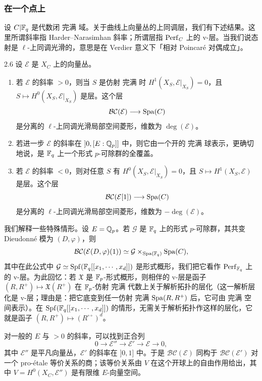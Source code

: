 \subsubsection{在一个点上}

设 $C|\mathbb{F}_q$ 是代数闭 完满 域。关于曲线上向量丛的上同调层，我们有下述结果。这里所谓斜率指 Harder–Narasimhan 斜率；所谓层指 $\operatorname{Perf}_C$ 上的 v-层。当我们说态射是 $\ell$-上同调光滑的，意思是在 Verdier 意义下「相对 Poincaré 对偶成立」。

\begin{thm}{2.6}
设 $\mathcal E$ 是 $X_C$ 上的向量丛。
\begin{enumerate}[label=(\arabic*),leftmargin=2.2em,itemsep=0.2em]
\item 若 $\mathcal E$ 的斜率 $>0$，则当 $S$ 是仿射 完满 时 $H^1(X_S,\mathcal E|_{X_S})=0$，且 $S\mapsto H^0(X_S,\mathcal E|_{X_S})$ 是层。这个层
\[
\mathcal{BC}(\mathcal E)\longrightarrow\operatorname{Spa}(C)
\]
是分离的 $\ell$-上同调光滑局部空间菱形，维数为 $\deg(\mathcal E)$。
\item 若进一步 $\mathcal E$ 的斜率在 $]0,[E:\mathbb{Q}_p]]$ 中，则它由一个开的 完满 球表示，更确切地说，是 $\mathbb{F}_q$ 上一个形式 $p$-可除群的全覆盖。
\item 若 $\mathcal E$ 的斜率 $<0$，则对任意 $S$ 有 $H^0(X_S,\mathcal E|_{X_S})=0$，且 $S\mapsto H^1(X_S,\mathcal E)$ 是层。这个层
\[
\mathcal{BC}(\mathcal E[1])\longrightarrow\operatorname{Spa}(C)
\]
是分离的 $\ell$-上同调光滑局部空间菱形，维数为 $-\deg(\mathcal E)$。
\end{enumerate}
\label{thm:a3-2-6}
\end{thm}

我们解释一些特殊情形。设 $E=\mathbb{Q}_p$。若 $\mathcal G$ 是 $\mathbb{F}_q$ 上的形式 $p$-可除群，其共变 Dieudonné 模为 $(D,\varphi)$，则
\[
\mathcal{BC}(\mathcal E(D,\varphi)(1))\simeq\mathcal G\times_{\operatorname{Spa}(\mathbb{F}_q)}\operatorname{Spa}(C),
\]
其中在此公式中 $\mathcal G\simeq\operatorname{Spf}(\mathbb{F}_q[[x_1,\cdots,x_d]])$ 是形式概形，我们把它看作 $\operatorname{Perf}_{\mathbb{F}_q}$ 上的 v-层。为此回忆：若 $\mathfrak X$ 是 $\mathbb{F}_p$-形式概形，则相伴的 v-层是函子 $(R,R^+)\mapsto\mathfrak X(R^+)$ 在 $\mathbb{F}_p$-仿射 完满 代数上关于解析拓扑的层化（这一解析层化是 v-层；理由是：把它底变到任一仿射 完满 $\operatorname{Spa}(R,R^+)$ 后，它可由 完满 空间表示）。在 $\operatorname{Spf}(\mathbb{F}_q[[x_1,\cdots,x_d]])$ 的情形，无需关于解析拓扑作这样的层化，它就是函子 $(R,R^+)\mapsto(R^{\circ\circ})^d$。

对一般的 $E$ 与 $>0$ 的斜率，可以找到正合列
\[
0\longrightarrow\mathcal E''\longrightarrow\mathcal E'\longrightarrow\mathcal E\longrightarrow 0,
\]
其中 $\mathcal E''$ 是平凡向量丛，$\mathcal E'$ 的斜率在 $]0,1]$ 中。于是 $\mathcal{BC}(\mathcal E)$ 同构于 $\mathcal{BC}(\mathcal E')$ 对一个 pro-étale 等价关系的商；该等价关系由 $V$ 在这个开球上的自由作用给出，其中 $V=H^0(X_C,\mathcal E'')$ 是有限维 $E$-向量空间。

